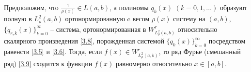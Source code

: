 \begin{state} 
Предположим, что  $ \frac{1}{\rho(x)}\in L(a,b) $, а  полиномы $q_k(x)$ $(k=0,1,\ldots)$  образуют полную в $L^2_\rho(a,b)$ ортонормированную   c весом   $\rho(x)$ систему на $(a,b)$, $\{q_{r,k}(x)\}_{k=0}^\infty$ -- система, ортонормированная в $W^r_{L^2_\rho(a,b)}$ относительно скалярного произведения \eqref{3.8}, порожденная системой $\{q_{k}(x)\}_{k=0}^\infty$ посредством равенств \eqref{3.5} и \eqref{3.6}.
Тогда, если $f(x)\in W^r_{L^2_\rho(a,b)}$, то ряд Фурье (смешанный ряд) \eqref{3.9} сходится к функции $f(x)$ равномерно относительно $x\in[a,b]$.
\end{state} 



